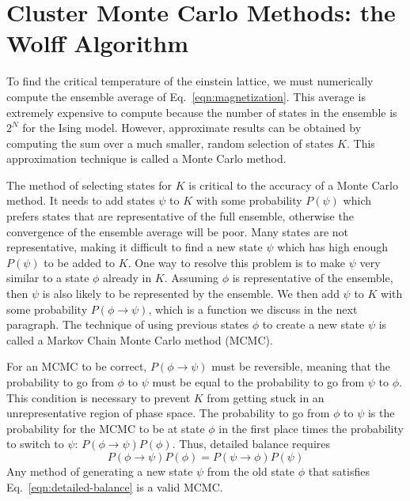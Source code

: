 \documentclass[
  amsmath,
  amssymb,
  aps,
  twocolumn,
  nofootinbib,
  floatfix,
]{revtex4-2}
\begin{document}
\section{Cluster Monte Carlo Methods: the Wolff Algorithm}
\label{sec:wolff}

To find the critical temperature of the einstein lattice, we must numerically compute the ensemble average of Eq.~\ref{eqn:magnetization}. This average is extremely expensive to compute because the number of states in the ensemble is $2^N$ for the Ising model. However, approximate results can be obtained by computing the sum over a much smaller, random selection of states $K$. This approximation technique is called a Monte Carlo method.

The method of selecting states for $K$ is critical to the accuracy of a Monte Carlo method. It needs to add states $\psi$ to $K$ with some probability $P(\psi)$ which prefers states that are representative of the full ensemble, otherwise the convergence of the ensemble average will be poor. Many states are not representative, making it difficult to find a new state $\psi$ which has high enough $P(\psi)$ to be added to $K$. One way to resolve this problem is to make $\psi$ very similar to a state $\phi$ already in $K$. Assuming $\phi$ is representative of the ensemble, then $\psi$ is also likely to be represented by the ensemble. We then add $\psi$ to $K$ with some probability $P(\phi \rightarrow \psi)$, which is a function we discuss in the next paragraph. The technique of using previous states $\phi$ to create a new state $\psi$ is called a Markov Chain Monte Carlo method (MCMC).

For an MCMC to be correct, $P(\phi \rightarrow \psi)$ must be reversible, meaning that the probability to go from $\phi$ to $\psi$ must be equal to the probability to go from $\psi$ to $\phi$. This condition is necessary to prevent $K$ from getting stuck in an unrepresentative region of phase space. The probability to go from $\phi$ to $\psi$ is the probability for the MCMC to be at state $\phi$ in the first place times the probability to switch to $\psi$: $P(\phi \rightarrow \psi)P(\phi)$. Thus, detailed balance requires
\begin{equation}
  P(\phi \rightarrow \psi)P(\phi) = P(\psi \rightarrow \phi)P(\psi)
  \label{eqn:detailed-balance}
\end{equation}
Any method of generating a new state $\psi$ from the old state $\phi$ that satisfies Eq.~\ref{eqn:detailed-balance} is a valid MCMC.
\end{document}

